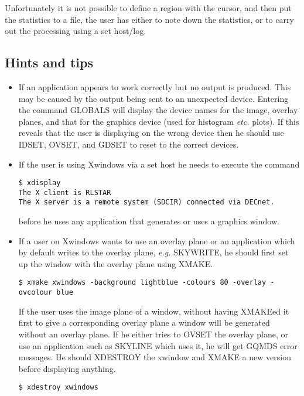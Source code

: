 \documentclass[twoside,11pt]{article}
\begin{document}
Unfortunately it is not possible to define a region with the cursor, and then
put the statistics to a file, the user has either to note down the statistics,
or to carry out the processing using a set host/log.
\subsection{Hints and tips}
\begin{itemize}
\item If an application appears to work correctly but no output is produced.
This may be caused by the output being sent to an unexpected device. Entering
the command GLOBALS will display the device names for the image, overlay planes,
and that for the graphics device (used for histogram {\em etc.} plots). If this
reveals that the user is displaying on the wrong device then he should use
IDSET, OVSET, and GDSET  to reset to the correct devices.
\item If the user is using Xwindows via a set host he needs to execute the
command 
\begin{small}
\begin{verbatim}
$ xdisplay
The X client is RLSTAR
The X server is a remote system (SDCIR) connected via DECnet.
\end{verbatim}
\end{small}
before he uses any application that generates or uses a graphics window.
\item If a user on Xwindows wants to use an overlay plane or an application
which by default writes to the overlay plane, {\em e.g.} SKYWRITE, he should
first
set up the window with the overlay plane using XMAKE.
\begin{small}
\begin{verbatim}
$ xmake xwindows -background lightblue -colours 80 -overlay -ovcolour blue
\end{verbatim}
\end{small}
If the user uses the image plane of a window, without having XMAKEed it first
to give a corresponding overlay plane a window will be generated without an
overlay plane. If he either tries to OVSET the overlay plane, or use an
application such as SKYLINE which uses it, he will get GQMDS error messages.
He should XDESTROY the xwindow and XMAKE a new version before displaying
anything.
\begin{small}
\begin{verbatim}
$ xdestroy xwindows
\end{verbatim}
\end{small}

\end{itemize}
\end{document}
